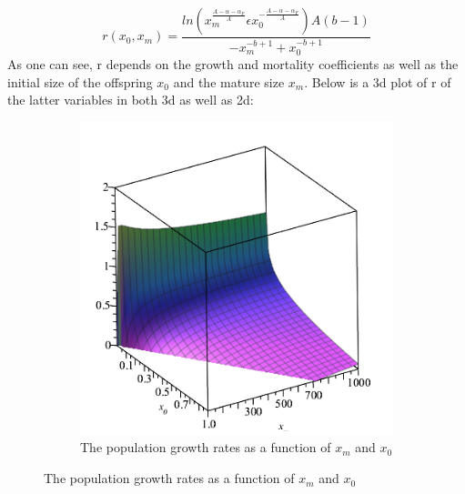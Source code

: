 \documentclass{article}
\numberwithin{equation}{section} %
\begin{document}
\begin{equation}\label{eq:rfunc}
	r(x_0,x_m) = \dfrac{ln\left( x_m^{\tfrac{A-\alpha-\alpha_F}{A}}\epsilon x_0^{-\tfrac{A-\alpha-\alpha_F}{A}}\right)A(b-1)}{-x_m^{-b+1}+x_0^{-b+1}}
\end{equation}
As one can see, r depends on the growth and mortality coefficients as well as the initial size of the offspring $x_0$ and the mature size $x_m$. Below is a 3d plot of r of the latter variables in both 3d as well as 2d:
\begin{figure}[h]
\begin{subfigure}[t]{0.5\textwidth}
\includegraphics[width=0.9\linewidth]{exercises/ex4p1} 
\caption{The population growth rates as a function of $x_m$ and $x_0$}


\end{subfigure}
\end{figure}
\end{document}
